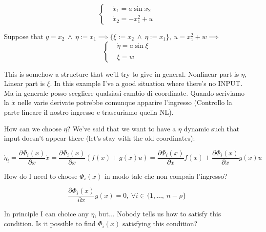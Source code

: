 \begin{itemize}
\[
	\left\{
	\begin{aligned}
	&\dot{x}_1 = a\sin{x_2} \\
	&\dot{x}_2 = -x_1^2 + u
	\end{aligned}
	\right.
\]

Suppose that $y=x_2\ \land\ \eta := x_1 \implies \{\xi := x_2\ \land\ \eta := x_1\},\ u = x_1^2 + w \implies$
\[
	\left\{
	\begin{aligned}
	&\dot{\eta} = a\sin{\xi} \\
	&\dot{\xi} = w
	\end{aligned}
	\right.
\]

This is somehow a structure that we'll try to give in general. Nonlinear part is $\eta$, Linear part is $\xi$. In this example I've a good situation where there's no INPUT. Ma in generale posso scegliere qualsiasi cambio di coordinate. Quando scriviamo la $\dot{x}$ nelle varie derivate potrebbe comunque apparire l'ingresso (Controllo la parte lineare il nostro ingresso e trascuriamo quella NL).

How can we choose $\eta$? We've said that we want to have a $\eta$ dynamic such that input doesn't appear there (let's stay with the old coordinates):

\[
	\dot{\eta}_i = \frac{\partial{\Phi_i(x)}}{\partial{x}}\dot{x} = \frac{\partial{\Phi_i(x)}}{\partial{x}}(f(x) + g(x)u) = \frac{\partial{\Phi_i(x)}}{\partial{x}}f(x) + \frac{\partial{\Phi_i(x)}}{\partial{x}}g(x)u
\]

How do I need to choose $\Phi_i(x)$ in modo tale che non compaia l'ingresso?

\[
	\frac{\partial{\Phi_i(x)}}{\partial{x}}g(x) = 0,\ \forall i \in \{1, \dots,\ n-\rho\}
\]

In principle I can choice any $\eta$, but... Nobody tells us how to satisfy this condition. Is it possible to find $\Phi_i(x)$ satisfying this condition?

\end{itemize}

